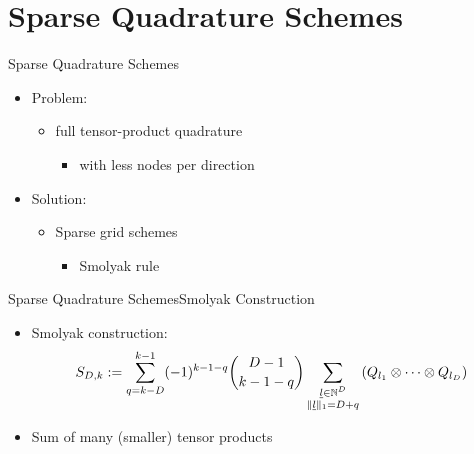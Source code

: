 \documentclass{beamer}
\begin{document}
\section{Sparse Quadrature Schemes}


\begin{frame}{Sparse Quadrature Schemes}
  \begin{itemize}
  \item Problem:
    \begin{itemize}
    \item full tensor-product quadrature
    \begin{itemize}
      \item with less nodes per direction
    \end{itemize}
    \end{itemize}
  \end{itemize}
  \vspace{0.5cm}
  \begin{itemize}
  \item Solution:
    \begin{itemize}
    \item Sparse grid schemes
    \begin{itemize}
      \item Smolyak rule
    \end{itemize}
    \end{itemize}
  \end{itemize}
\end{frame}


\begin{frame}{Sparse Quadrature Schemes}{Smolyak Construction}
  \begin{itemize}
    \item Smolyak construction:
    \begin{equation*}
      S_{D,k} := \sum_{q=k-D}^{k-1} (-1)^{k-1-q} \binom{D-1}{k-1-q}
                      \sum_{\substack{\underline{l} \in \mathbb{N}^D \\
                                      \|\underline{l}\|_1 = D+q}}
                        \left(Q_{l_1} \otimes \cdots \otimes Q_{l_D}\right)
    \end{equation*}
    \item Sum of many (smaller) tensor products
  \end{itemize}
\end{frame}
\end{document}
